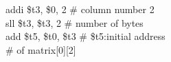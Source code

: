 \documentclass[../main.tex]{subfiles}
\begin{document}
{    \hspace*{4mm} \hspace*{0cm} \hspace*{0cm} \hspace*{0cm} \hspace*{0cm} addi \$t3, \$0, 2 \hspace*{0cm} \hspace*{0cm} \hspace*{0cm} \hspace*{0cm} \# column number 2 \\
    \hspace*{4mm} \hspace*{0cm} \hspace*{0cm} \hspace*{0cm} \hspace*{0cm} sll \$t3, \$t3, 2 \hspace*{0cm} \hspace*{0cm} \hspace*{0cm} \hspace*{0cm} \# number of bytes \\
    \hspace*{4mm} \hspace*{0cm} \hspace*{0cm} \hspace*{0cm} \hspace*{0cm} add \$t5, \$t0, \$t3 \hspace*{0cm} \hspace*{0cm} \# \$t5:\hspace*{2.1mm}initial address \\
    \hspace*{4mm} \hspace*{0cm} \hspace*{0cm} \hspace*{0cm} \hspace*{0cm} \hspace*{0cm} \hspace*{0cm} \hspace*{0cm} \hspace*{0cm} \hspace*{0cm} \hspace*{0cm} \hspace*{0cm} \hspace*{0cm} \hspace*{0cm} \hspace*{0cm} \hspace*{0cm} \hspace*{0cm} \hspace*{0cm} \hspace*{0cm} \hspace*{0cm} \hspace*{0cm} \hspace*{0cm} \hspace*{0cm} \hspace*{0cm} \hspace*{0cm} \# of matrix[0][2] \\
}
\end{document}

